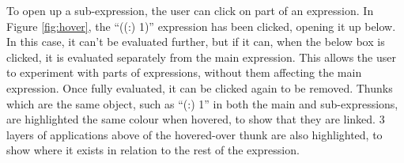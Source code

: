 
To open up a sub-expression, the user can click on part of an expression. In Figure \ref{fig:hover}, the ``((:) 1)'' expression has been clicked, opening it up below. In this case, it can't be evaluated further, but if it can, when the below box is clicked, it is evaluated separately from the main expression. This allows the user to experiment with parts of expressions, without them affecting the main expression. Once fully evaluated, it can be clicked again to be removed. Thunks which are the same object, such as ``(:) 1'' in both the main and sub-expressions, are highlighted the same colour when hovered, to show that they are linked. 3 layers of applications above of the hovered-over thunk are also highlighted, to show where it exists in relation to the rest of the expression.